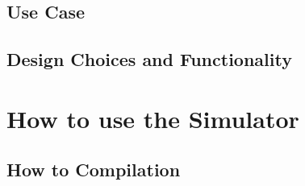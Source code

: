 \documentclass[letterpaper, 11pt, twoside]{article}
\begin{document}
\paragraph{}

\subsection{Use Case}
\paragraph{}

\subsection{Design Choices and Functionality}
\paragraph{}


\clearpage

\section[Simulator Usage]{How to use the Simulator}
\paragraph{}

\subsection[Compilation]{How to Compilation}
\paragraph{}

\end{document}
